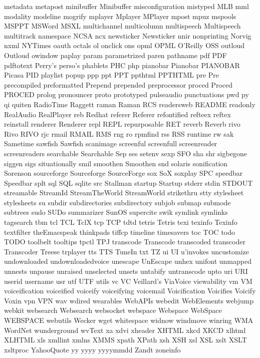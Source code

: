 metadata
metapost
minibuffer
Minibuffer
misconfiguration
mistyped
MLB
mml
modality
modeline
mogrify
mplayer
Mplayer
MPlayer
mpost
mpuz
mspools
MSPPT
MSWord
MSXL
multichannel
multicolumn
multispeech
Multispeech
multitrack
namespace
NCSA
ncx
newsticker
Newsticker
nnir
nonprinting
Norvig
nxml
NYTimes
oauth
octals
ol
onclick
ons
opml
OPML
O'Reilly
OSS
outloud
Outloud
owindow
paplay
param
parametrized
paren
pathname
pdf
PDF
pdftotext
Perry's
perso's
phablets
PHC
php
pianobar
Pianobar
PIANOBAR
Picasa
PID
playlist
popup
ppp
ppt
PPT
ppthtml
PPTHTML
pre
Pre
precompiled
preformatted
Prepend
prepended
preprocessor
proced
Proced
PROCED
prolog
pronouncer
proto
prototyped
pulseaudio
punctuations
pwd
py
qi
quiten
RadioTime
Raggett
raman
Raman
RCS
readersweb
README
readonly
RealAudio
RealPlayer
reb
Redhat
referer
Referer
refontified
refteex
reftex
reinstall
renderer
Renderer
repl
REPL
repurposable
RET
reverb
Reverb
rivo
Rivo
RIVO
rjc
rmail
RMAIL
RMS
rng
ro
rpmfind
rss
RSS
runtime
rw
sak
Sametime
sawfish
Sawfish
scanimage
screenful
screenfull
screenreader
screenreaders
searchable
Searchable
Sep
ses
setenv
sexp
SFO
sha
shr
sigbegone
siggen
sigs
situationally
smil
smoothen
Smoothen
snd
solaris
sonification
Sorenson
sourceforge
Sourceforge
SourceForge
sox
SoX
soxplay
SPC
speedbar
Speedbar
splt
sql
SQL
sqlite
src
Stallman
startup
Startup
stderr
stdin
STDOUT
streamable
StreamId
StreamTheWorld
StreamWorld
strikethru
stty
stylesheet
stylesheets
su
subdir
subdirectories
subdirectory
subjob
submap
submode
subtrees
sudo
SUDo
summarizer
SunOS
supercite
swik
symlink
symlinks
tagsearch
tbm
tcl
TCL
TclX
tcp
TCP
tdtd
tetris
Tetris
texi
texinfo
Texinfo
textfilter
theEmacspeak
thinkpads
tiffcp
timeline
timesavers
toc
TOC
todo
TODO
toolbelt
tooltips
tpctl
TPJ
transcode
Transcode
transcoded
transcoder
Transcoder
Treese
trplayer
tts
TTS
TuneIn
txt
TZ
ui
UI
u'invokes
uncustomize
undownloaded
undownloadedvoice
unescape
UnEscape
unhex
unifont
unmapped
unnests
unpause
unraised
unselected
unsets
untabify
untranscode
upto
uri
URI
userid
username
usr
utf
UTF
utils
vc
VC
Veillard's
ViaVoice
viewability
vm
VM
voiceification
voiceified
voiceify
voiceifying
voicemail
Voicification
Voicifies
Voicify
Voxin
vpn
VPN
wav
wdired
wearables
WebAPIs
webedit
WebElements
webjump
webkit
websearch
Websearch
websocket
webspace
Webspace
WebSpace
WEBSPACE
webutils
Wecker
wget
whitespace
widnow
windmove
winring
WMA
WordNet
wunderground
wvText
xa
xdvi
xheader
XHTML
xkcd
XKCD
xlhtml
XLHTML
xls
xmllint
xmlns
XMMS
xpath
XPath
xsh
XSH
xsl
XSL
xslt
XSLT
xsltproc
YahooQuote
yy
yyyy
yyyymmdd
Zandt
zoneinfo
